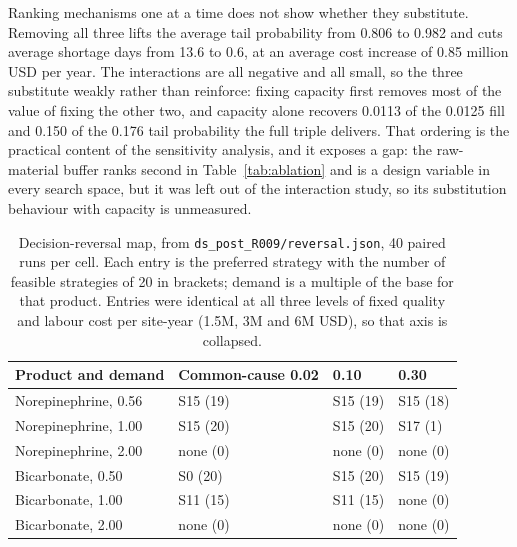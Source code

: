 Ranking mechanisms one at a time does not show whether they substitute. Removing all three lifts
the average tail probability from 0.806 to 0.982 and cuts average shortage days from 13.6 to 0.6,
at an average cost increase of 0.85 million USD per year. The interactions are all negative and
all small, so the three substitute weakly rather than reinforce: fixing capacity first removes
most of the value of fixing the other two, and capacity alone recovers 0.0113 of the 0.0125 fill
and 0.150 of the 0.176 tail probability the full triple delivers. That ordering is the practical
content of the sensitivity analysis, and it exposes a gap: the raw-material buffer ranks second in
Table~\ref{tab:ablation} and is a design variable in every search space, but it was left out of
the interaction study, so its substitution behaviour with capacity is unmeasured.

\begin{table}[htbp]
\centering
\caption{Decision-reversal map, from \texttt{ds\_post\_R009/reversal.json}, 40 paired runs per
cell. Each entry is the preferred strategy with the number of feasible strategies of 20 in
brackets; demand is a multiple of the base for that product. Entries were identical at all three
levels of fixed quality and labour cost per site-year (1.5M, 3M and 6M USD), so that axis is
collapsed.}
\label{tab:reversal}
\footnotesize
\setlength{\tabcolsep}{8pt}
\begin{tabular}{@{}llll@{}}
\toprule
Product and demand & Common-cause 0.02 & 0.10 & 0.30 \\
\midrule
Norepinephrine, 0.56 & S15 (19) & S15 (19) & S15 (18) \\
Norepinephrine, 1.00 & S15 (20) & S15 (20) & S17 (1) \\
Norepinephrine, 2.00 & none (0) & none (0) & none (0) \\
Bicarbonate, 0.50 & S0 (20) & S15 (20) & S15 (19) \\
Bicarbonate, 1.00 & S11 (15) & S11 (15) & none (0) \\
Bicarbonate, 2.00 & none (0) & none (0) & none (0) \\
\bottomrule
\end{tabular}
\end{table}

